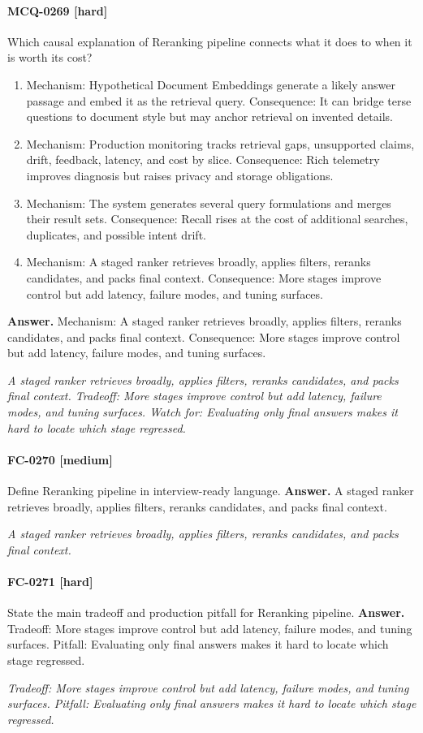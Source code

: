 \paragraph{MCQ-0269 [hard]} Which causal explanation of Reranking pipeline connects what it does to when it is worth its cost?
\begin{enumerate}[label=\Alph*.]
\item Mechanism: Hypothetical Document Embeddings generate a likely answer passage and embed it as the retrieval query. Consequence: It can bridge terse questions to document style but may anchor retrieval on invented details.
\item Mechanism: Production monitoring tracks retrieval gaps, unsupported claims, drift, feedback, latency, and cost by slice. Consequence: Rich telemetry improves diagnosis but raises privacy and storage obligations.
\item Mechanism: The system generates several query formulations and merges their result sets. Consequence: Recall rises at the cost of additional searches, duplicates, and possible intent drift.
\item Mechanism: A staged ranker retrieves broadly, applies filters, reranks candidates, and packs final context. Consequence: More stages improve control but add latency, failure modes, and tuning surfaces.
\end{enumerate}
\noindent\textbf{Answer.} Mechanism: A staged ranker retrieves broadly, applies filters, reranks candidates, and packs final context. Consequence: More stages improve control but add latency, failure modes, and tuning surfaces.
\par\textit{A staged ranker retrieves broadly, applies filters, reranks candidates, and packs final context. Tradeoff: More stages improve control but add latency, failure modes, and tuning surfaces. Watch for: Evaluating only final answers makes it hard to locate which stage regressed.}
\paragraph{FC-0270 [medium]} Define Reranking pipeline in interview-ready language.
\noindent\textbf{Answer.} A staged ranker retrieves broadly, applies filters, reranks candidates, and packs final context.
\par\textit{A staged ranker retrieves broadly, applies filters, reranks candidates, and packs final context.}
\paragraph{FC-0271 [hard]} State the main tradeoff and production pitfall for Reranking pipeline.
\noindent\textbf{Answer.} Tradeoff: More stages improve control but add latency, failure modes, and tuning surfaces. Pitfall: Evaluating only final answers makes it hard to locate which stage regressed.
\par\textit{Tradeoff: More stages improve control but add latency, failure modes, and tuning surfaces. Pitfall: Evaluating only final answers makes it hard to locate which stage regressed.}
